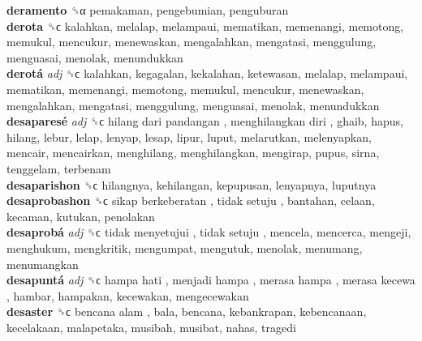 \textbf{deramento} ␝α  pemakaman, pengebumian, penguburan  \\
\textbf{derota} ␝ϲ  kalahkan, melalap, melampaui, mematikan, memenangi, memotong, memukul, mencukur, menewaskan, mengalahkan, mengatasi, menggulung, menguasai, menolak, menundukkan  \\
\textbf{derotá} \emph{adj}  ␝ϲ  kalahkan, kegagalan, kekalahan, ketewasan, melalap, melampaui, mematikan, memenangi, memotong, memukul, mencukur, menewaskan, mengalahkan, mengatasi, menggulung, menguasai, menolak, menundukkan  \\
\textbf{desaparesé} \emph{adj}  ␝ϲ   hilang dari pandangan ,  menghilangkan diri , ghaib, hapus, hilang, lebur, lelap, lenyap, lesap, lipur, luput, melarutkan, melenyapkan, mencair, mencairkan, menghilang, menghilangkan, mengirap, pupus, sirna, tenggelam, terbenam  \\
\textbf{desaparishon} ␝ϲ  hilangnya, kehilangan, kepupusan, lenyapnya, luputnya  \\
\textbf{desaprobashon} ␝ϲ   sikap berkeberatan ,  tidak setuju , bantahan, celaan, kecaman, kutukan, penolakan  \\
\textbf{desaprobá} \emph{adj}  ␝ϲ   tidak menyetujui ,  tidak setuju , mencela, mencerca, mengeji, menghukum, mengkritik, mengumpat, mengutuk, menolak, menumang, menumangkan  \\
\textbf{desapuntá} \emph{adj}  ␝ϲ   hampa hati ,  menjadi hampa ,  merasa hampa ,  merasa kecewa , hambar, hampakan, kecewakan, mengecewakan  \\
\textbf{desaster} ␝ϲ   bencana alam , bala, bencana, kebankrapan, kebencanaan, kecelakaan, malapetaka, musibah, musibat, nahas, tragedi  \\
